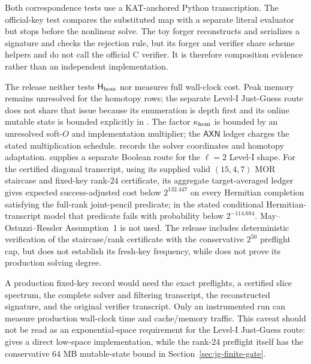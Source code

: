 \documentclass[11pt]{article}
\newcommand{\AXN}{\mathsf{AXN}}
\begin{document}
Both correspondence tests use a KAT-anchored Python transcription.  The
official-key test compares the substituted map with a separate literal
evaluator but stops before the nonlinear solve.  The toy forger reconstructs
and serializes a signature and checks the rejection rule, but its forger and
verifier share scheme helpers and do not call the official C verifier.  It is
therefore composition evidence rather than an independent implementation.

The release neither tests $\mathsf H_{\rm hom}$ nor measures full wall-clock cost.  Peak memory remains unresolved for the homotopy rows; the separate Level-I Just-Guess route does not share that issue because its enumeration is depth first and its online mutable state is bounded explicitly in .  The factor $\kappa_{\rm hom}$ is bounded by
an unresolved soft-$O$ and implementation
multiplier; the $\AXN$ ledger
charges the stated multiplication schedule.  
records the solver coordinates and homotopy adaptation.
 supplies a separate Boolean route for the
$\ell=2$ Level-I shape.  For the certified diagonal transcript, using its supplied valid $(15,4,7)$ MOR staircase and fixed-key rank-$24$ certificate, its aggregate
target-averaged
ledger gives expected success-adjusted cost below $2^{132.447}$ on every
Hermitian completion satisfying the full-rank joint-pencil predicate; in the
stated conditional Hermitian-transcript model that predicate fails with
probability below $2^{-114.684}$.  May--Ostuzzi--Ressler Assumption~1 is not
used.  The release includes deterministic verification of the staircase/rank certificate with the conservative $2^{50}$ preflight cap, but does not establish its fresh-key frequency, while
 does not prove its production solving degree.

A production fixed-key record would need the exact preflights, a certified
slice spectrum, the complete solver and filtering transcript, the reconstructed
signature, and the original verifier transcript.  Only an instrumented run can measure production wall-clock time and cache/memory traffic.  This caveat should not be read as an exponential-space requirement for the Level-I Just-Guess route:  gives a direct low-space implementation, while the rank-$24$ preflight itself has the conservative $64$ MB mutable-state bound in Section~\ref{sec:jg-finite-gate}.
\end{document}
